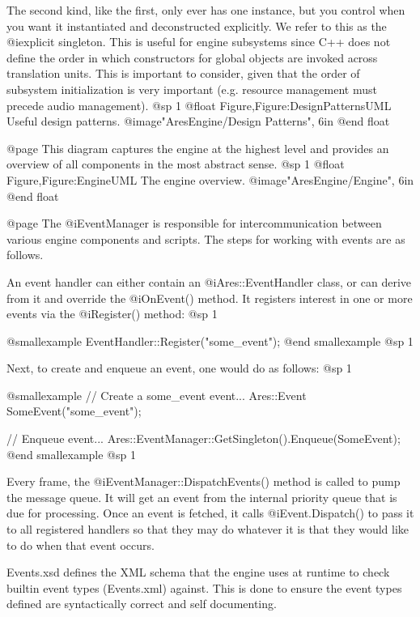 The second kind, like the first, only ever has one instance, but you control when you want it instantiated and deconstructed explicitly. We refer to this as the @i{explicit singleton}. This is useful for engine subsystems since C++ does not define the order in which constructors for global objects are invoked across translation units. This is important to consider, given that the order of subsystem initialization is very important (e.g. resource management must precede audio management).
@sp 1
@float Figure,Figure:DesignPatternsUML
Useful design patterns.
@image{"AresEngine/Design Patterns", 6in}
@end float

@page
This diagram captures the engine at the highest level and provides an overview of all components in the most abstract sense.
@sp 1
@float Figure,Figure:EngineUML
The engine overview.
@image{"AresEngine/Engine", 6in}
@end float

@page 
The @i{EventManager} is responsible for intercommunication between various engine components and scripts. The steps for working with events are as follows.

An event handler can either contain an @i{Ares::EventHandler} class, or can derive from it and override the @i{OnEvent()} method. It registers interest in one or more events via the @i{Register()} method:
@sp 1

@smallexample
EventHandler::Register("some_event");
@end smallexample
@sp 1

Next, to create and enqueue an event, one would do as follows:
@sp 1

@smallexample
// Create a some_event event...
Ares::Event SomeEvent("some_event");

// Enqueue event...
Ares::EventManager::GetSingleton().Enqueue(SomeEvent);
@end smallexample
@sp 1

Every frame, the @i{EventManager::DispatchEvents()} method is called to pump the message queue. It will get an event from the internal priority queue that is due for processing. Once an event is fetched, it calls @i{Event.Dispatch()} to pass it to all registered handlers so that they may do whatever it is that they would like to do when that event occurs.

Events.xsd defines the XML schema that the engine uses at runtime to check builtin event types (Events.xml) against. This is done to ensure the event types defined are syntactically correct and self documenting.

